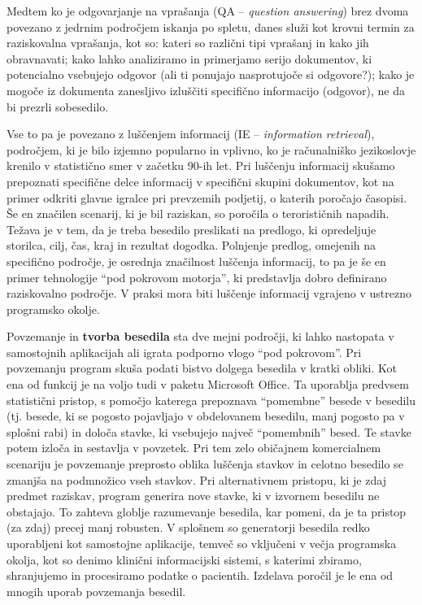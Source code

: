\begin{multicols}{2}
Medtem ko je odgovarjanje na vprašanja (QA – \textit{question answering}) brez dvoma povezano z jedrnim področjem iskanja po spletu, danes služi kot krovni termin za raziskovalna vprašanja, kot so: kateri so različni tipi vprašanj in kako jih obravnavati; kako lahko analiziramo in primerjamo serijo dokumentov, ki potencialno vsebujejo odgovor (ali ti ponujajo nasprotujoče si odgovore?); kako je mogoče iz dokumenta zanesljivo izluščiti specifično informacijo (odgovor), ne da bi prezrli sobesedilo.

Vse to pa je povezano z luščenjem informacij (IE – \textit{information retrieval}), področjem, ki je bilo izjemno popularno in vplivno, ko je računalniško jezikoslovje krenilo v statistično smer v začetku 90-ih let. Pri luščenju informacij skušamo prepoznati specifične delce informacij v specifični skupini dokumentov, kot na primer odkriti glavne igralce pri prevzemih podjetij, o katerih poročajo časopisi. Še en značilen scenarij, ki je bil raziskan, so poročila o terorističnih napadih. Težava je v tem, da je treba besedilo preslikati na predlogo, ki opredeljuje storilca, cilj, čas, kraj in rezultat dogodka. Polnjenje predlog, omejenih na specifično področje, je osrednja značilnost luščenja informacij, to pa je še en primer tehnologije “pod pokrovom motorja”, ki predstavlja dobro definirano raziskovalno področje. V praksi mora biti luščenje informacij vgrajeno v ustrezno programsko okolje.

Povzemanje in \textbf{tvorba besedila} sta dve mejni področji, ki lahko nastopata v samostojnih aplikacijah ali igrata podporno vlogo “pod pokrovom”. Pri povzemanju program skuša podati bistvo dolgega besedila v kratki obliki. Kot ena od funkcij je na voljo tudi v paketu Microsoft Office. Ta uporablja predvsem statistični pristop, s pomočjo katerega prepoznava “pomembne” besede v besedilu (tj. besede, ki se pogosto pojavljajo v obdelovanem besedilu, manj pogosto pa v splošni rabi) in določa stavke, ki vsebujejo največ “pomembnih” besed. Te stavke potem izloča in sestavlja v povzetek. Pri tem zelo običajnem komercialnem scenariju je povzemanje preprosto oblika luščenja stavkov in celotno besedilo se zmanjša na podmnožico vseh stavkov. Pri alternativnem pristopu, ki je zdaj predmet raziskav, program generira nove stavke, ki v izvornem besedilu ne obstajajo. To zahteva globlje razumevanje besedila, kar pomeni, da je ta pristop (za zdaj) precej manj robusten. V splošnem so generatorji besedila redko uporabljeni kot samostojne aplikacije, temveč so vključeni v večja programska okolja, kot so denimo klinični informacijski sistemi, s katerimi zbiramo, shranjujemo in procesiramo podatke o pacientih. Izdelava poročil je le ena od mnogih uporab povzemanja besedil.


\end{multicols}
